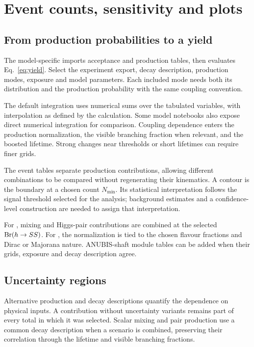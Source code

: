 \section{Event counts, sensitivity and plots}\label{sec:sensitivity}
\subsection{From production probabilities to a yield}
The model-specific  imports acceptance and production tables, then evaluates Eq.~\eqref{eq:yield}. Select the experiment export, decay description, production modes, exposure and model parameters. Each included mode needs both its distribution and the production probability with the same coupling convention.

The default integration uses numerical sums over the tabulated variables, with interpolation as defined by the calculation. Some model notebooks also expose direct numerical integration for comparison. Coupling dependence enters the production normalization, the visible branching fraction when relevant, and the boosted lifetime. Strong changes near thresholds or short lifetimes can require finer grids.

The event tables separate production contributions, allowing different combinations to be compared without regenerating their kinematics. A contour is the boundary at a chosen count $N_{\min}$. Its statistical interpretation follows the signal threshold selected for the analysis; background estimates and a confidence-level construction are needed to assign that interpretation.

For , mixing and Higgs-pair contributions are combined at the selected $\operatorname{Br}(h\to SS)$. For , the normalization is tied to the chosen flavour fractions and Dirac or Majorana nature. ANUBIS-shaft module tables can be added when their grids, exposure and decay description agree.

\subsection{Uncertainty regions}
Alternative production and decay descriptions quantify the dependence on physical inputs. A contribution without uncertainty variants remains part of every total in which it was selected. Scalar mixing and pair production use a common decay description when a scenario is combined, preserving their correlation through the lifetime and visible branching fractions.

